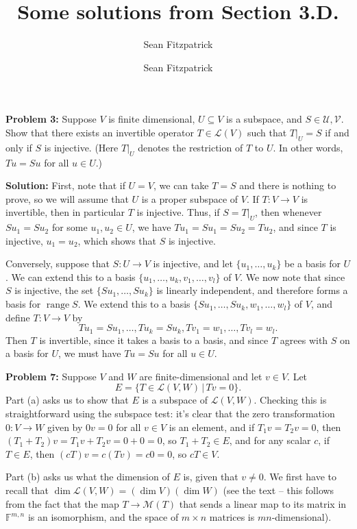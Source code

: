 \documentclass[12pt,letterpaper]{article}
\author{Sean Fitzpatrick}
\title{Some solutions from Section 3.D.}
\author{Sean Fitzpatrick}
\renewcommand{\L}{\mathcal{L}}
\newcommand{\M}{\mathcal{M}}
\DeclareMathOperator{\range}{range}
\begin{document}
\maketitle

{\bf Problem 3:} Suppose $V$ is finite dimensional, $U\subseteq V$ is a subspace, and $S\in\mathcal{U,V}$. Show that there exists an invertible operator $T\in\L(V)$ such that $T|_U = S$ if and only if $S$ is injective. (Here $T|_U$ denotes the restriction of $T$ to $U$. In other words, $Tu=Su$ for all $u\in U$.)

\bigskip

{\bf Solution:} First, note that if $U=V$, we can take $T=S$ and there is nothing to prove, so we will assume that $U$ is a proper subspace of $V$. If $T:V\to V$ is invertible, then in particular $T$ is injective. Thus, if $S=T|_U$, then whenever $Su_1=Su_2$ for some $u_1,u_2\in U$, we have $Tu_1=Su_1=Su_2=Tu_2$, and since $T$ is injective, $u_1=u_2$, which shows that $S$ is injective.

Conversely, suppose that $S:U\to V$ is injective, and let $\{u_1,\ldots, u_k\}$ be a basis for $U$. We can extend this to a basis $\{u_1,\ldots, u_k,v_1,\ldots, v_l\}$ of $V$. We now note that since $S$ is injective, the set $\{Su_1,\ldots, Su_k\}$ is linearly independent, and therefore forms a basis for $\range S$. We extend this to a basis $\{Su_1,\ldots, Su_k,w_1,\ldots, w_l\}$ of $V$, and define $T:V\to V$ by
\[
Tu_1 = Su_1, \ldots, Tu_k=Su_k, Tv_1 = w_1, \ldots, Tv_l = w_l.
\]
Then $T$ is invertible, since it takes a basis to a basis, and since $T$ agrees with $S$ on a basis for $U$, we must have $Tu=Su$ for all $u\in U$.

\bigskip

{\bf Problem 7:} Suppose $V$ and $W$ are finite-dimensional and let $v\in V$. Let
\[
E = \{T\in\L(V,W) \,|\, Tv=0\}.
\]
Part (a) asks us to show that $E$ is a subspace of $\L(V,W)$. Checking this is straightforward using the subspace test: it's clear that the zero transformation $0:V\to W$ given by $0v=0$ for all $v\in V$ is an element, and if $T_1v=T_2v = 0$, then $(T_1+T_2)v = T_1v+T_2v = 0+0=0$, so $T_1+T_2\in E$, and for any scalar $c$, if $T\in E$, then $(cT)v = c(Tv)=c0=0$, so $cT\in V$.

Part (b) asks us what the dimension of $E$ is, given that $v\neq 0$. We first have to recall that $\dim \L(V,W) = (\dim V)(\dim W)$ (see the text -- this follows from the fact that the map $T\to\M(T)$ that sends a linear map to its matrix in $\mathbb{F}^{m,n}$ is an isomorphism, and the space of $m\times n$ matrices is $mn$-dimensional).
\end{document}
